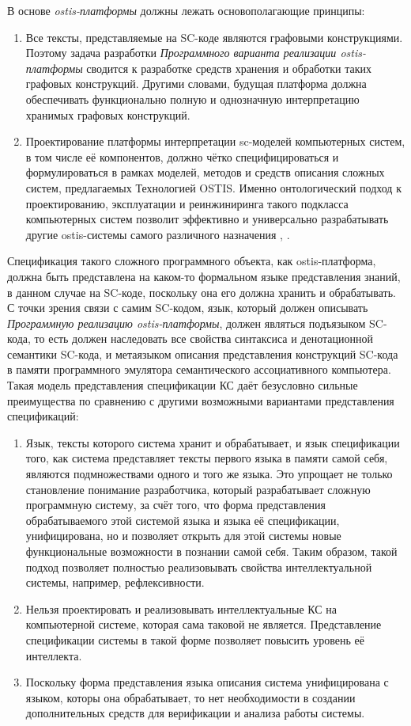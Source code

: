 
В основе \textit{ostis-платформы} должны лежать основополагающие принципы:
\begin{enumerate}
    \item Все тексты, представляемые на SC-коде являются графовыми конструкциями. Поэтому задача разработки \textit{Программного варианта реализации ostis-платформы} сводится к разработке средств хранения и обработки таких графовых конструкций. Другими словами, будущая платформа должна обеспечивать функционально полную и однозначную интерпретацию хранимых графовых конструкций.
    \item Проектирование платформы интерпретации sc-моделей компьютерных систем, в том числе её компонентов, должно чётко специфицироваться и формулироваться в рамках моделей, методов и средств описания сложных систем, предлагаемых Технологией OSTIS. Именно онтологический подход к проектированию, эксплуатации и реинжиниринга такого подкласса компьютерных систем позволит эффективно и универсально разрабатывать другие ostis-системы самого различного назначения \cite{Molorodov2019}, \cite{zapata2010ontologies}.
\end{enumerate}

Спецификация такого сложного программного объекта, как ostis-платформа, должна быть представлена на каком-то формальном языке представления знаний, в данном случае на SC-коде, поскольку она его должна хранить и обрабатывать. С точки зрения связи с самим SC-кодом, язык, который должен описывать \textit{Программную реализацию ostis-платформы}, должен являться подъязыком SC-кода, то есть должен наследовать все свойства синтаксиса и денотационной семантики SC-кода, и метаязыком описания представления конструкций SC-кода в памяти программного эмулятора семантического ассоциативного компьютера. Такая модель представления спецификации КС даёт безусловно сильные преимущества по сравнению с другими возможными вариантами представления спецификаций:
\begin{enumerate}
    \item Язык, тексты которого система хранит и обрабатывает, и язык спецификации того, как система представляет тексты первого языка в памяти самой себя, являются подмножествами одного и того же языка. Это упрощает не только становление понимание разработчика, который разрабатывает сложную программную систему, за счёт того, что форма представления обрабатываемого этой системой языка и языка её спецификации, унифицирована, но и позволяет открыть для этой системы новые функциональные возможности в познании самой себя. Таким образом, такой подход позволяет полностью реализовывать свойства интеллектуальной системы, например, рефлексивности.
    \item Нельзя проектировать и реализовывать интеллектуальные КС на компьютерной системе, которая сама таковой не является. Представление спецификации системы в такой форме позволяет повысить уровень её интеллекта.
    \item Поскольку форма представления языка описания система унифицирована с языком, которы она обрабатывает, то нет необходимости в создании дополнительных средств для верификации и анализа работы системы.
\end{enumerate}

